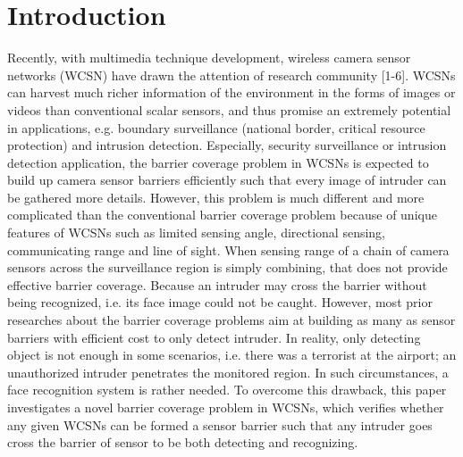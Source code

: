 \documentclass[3p]{elsarticle}
\begin{document}
\section{Introduction}
\label{sec:intro}
Recently, with multimedia technique development, wireless camera sensor networks (WCSN) have drawn the attention of research community [1-6]. WCSNs can harvest much richer information of the environment in the forms of images or videos than conventional scalar sensors, and thus promise an extremely potential in applications, e.g. boundary surveillance (national border, critical resource protection) and intrusion detection. Especially, security surveillance or intrusion detection application, the barrier coverage problem in WCSNs is expected to build up camera sensor barriers efficiently such that every image of intruder can be gathered more details. However, this problem is much different and more complicated than the conventional barrier coverage problem because of unique features of WCSNs such as limited sensing angle, directional sensing, communicating range and line of sight. When sensing range of a chain of camera sensors across the surveillance region is simply combining, that does not provide effective barrier coverage. Because an intruder may cross the barrier without being recognized, i.e. its face image could not be caught. However, most prior researches about the barrier coverage problems aim at building as many as sensor barriers with efficient cost to only detect intruder. In reality, only detecting object is not enough in some scenarios, i.e. there was a terrorist at the airport; an unauthorized intruder penetrates the monitored region. In such circumstances, a face recognition system is rather needed. To overcome this drawback, this paper investigates a novel barrier coverage problem in WCSNs, which verifies whether any given WCSNs can be formed a sensor barrier such that any intruder goes cross the barrier of sensor to be both detecting and recognizing.   
\end{document}
